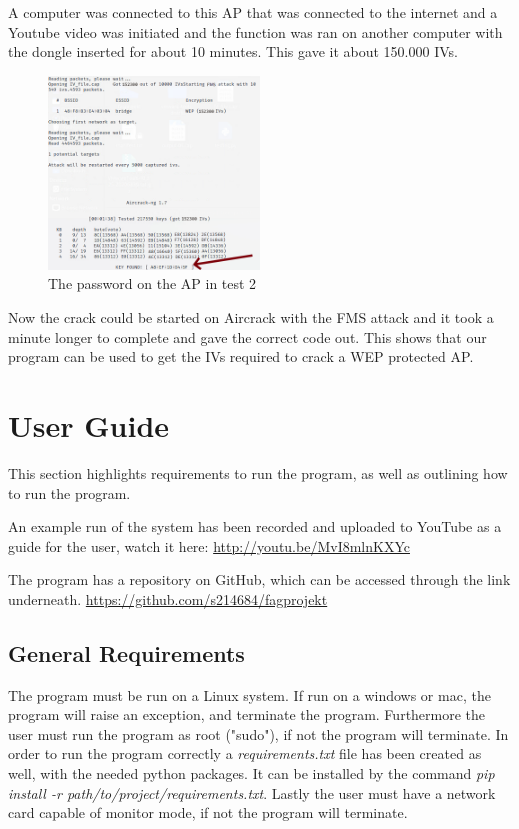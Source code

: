 A computer was connected to this AP that was connected to the internet and a Youtube video was initiated and the function was ran on another computer with the dongle inserted for about 10 minutes. This gave it about 150.000 IVs.

\begin{figure}[!htbp]
    \centering
    \includegraphics[width=0.5\textwidth]{Latex-Files/Billeder/Tests/WEP2.png}
    \caption{The password on the AP in test 2}
    \label{Crack4}
\end{figure}

Now the crack could be started on Aircrack with the FMS attack and it took a minute longer to complete and gave the correct code out. This shows that our program can be used to get the IVs required to crack a WEP protected AP.

\section{User Guide}
This section highlights requirements to run the program, as well as outlining how to run the program. 

An example run of the system has been recorded and uploaded to YouTube as a guide for the user, watch it here:
\url{http://youtu.be/MvI8mlnKXYc}

The program has a repository on GitHub, which can be accessed through the link underneath.
\url{https://github.com/s214684/fagprojekt}
\subsection{General Requirements}
The program must be run on a Linux system. If run on a windows or mac, the program will raise an exception, and terminate the program. Furthermore the user must run the program as root ("sudo"), if not the program will terminate. In order to run the program correctly a \textit{requirements.txt} file has been created as well, with the needed python packages. It can be installed by the command \textit{pip install  -r path/to/project/requirements.txt}.
Lastly the user must have a network card capable of monitor mode, if not the program will terminate.
